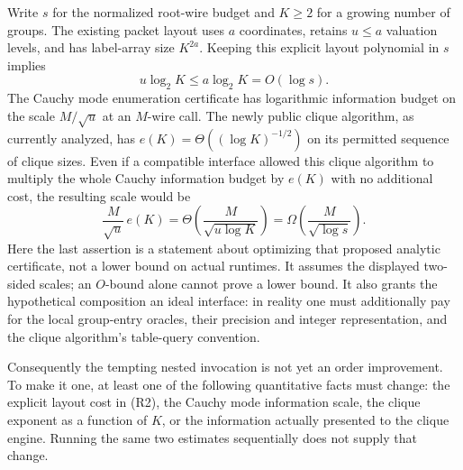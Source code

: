Write $s$ for the normalized root-wire budget and $K\ge2$ for a growing
number of groups.  The existing packet layout uses $a$ coordinates,
retains $u\le a$ valuation levels, and has label-array size
$K^{2a}$.  Keeping this explicit layout polynomial in $s$ implies
\[
 u\log_2K\le a\log_2K=O(\log s).                    \tag{R2}
\]
The Cauchy mode enumeration certificate has logarithmic information
budget on the scale $M/\sqrt u$ at an $M$-wire call.
The newly public clique algorithm, as currently analyzed, has
$e(K)=\Theta((\log K)^{-1/2})$ on its permitted sequence of clique sizes.
Even if a compatible interface allowed this clique algorithm to multiply
the whole Cauchy information budget by $e(K)$ with no additional cost,
the resulting scale would be
\[
 \frac{M}{\sqrt u}\,e(K)
 =\Theta\!\left(\frac{M}{\sqrt{u\log K}}\right)
 =\Omega\!\left(\frac{M}{\sqrt{\log s}}\right).      \tag{R3}
\]
Here the last assertion is a statement about optimizing that proposed
analytic certificate, not a lower bound on actual runtimes.  It assumes
the displayed two-sided scales; an $O$-bound alone cannot prove a lower
bound.  It also grants the hypothetical composition an ideal interface:
in reality one must additionally pay for the local group-entry oracles,
their precision and integer representation, and the clique algorithm's
table-query convention.

Consequently the tempting nested invocation is not yet an order
improvement.  To make it one, at least one of the following quantitative
facts must change: the explicit layout cost in (R2), the Cauchy mode
information scale, the clique exponent as a function of $K$, or the
information actually presented to the clique engine.  Running the same
two estimates sequentially does not supply that change.

